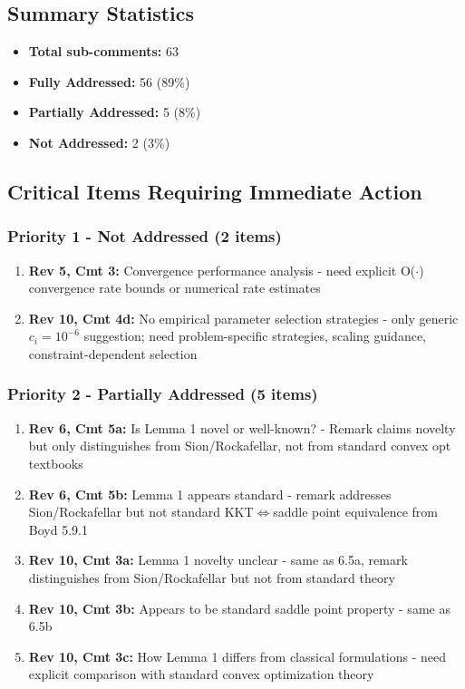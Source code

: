 \documentclass[journal,twoside,web]{ieeecolor}
\begin{document}
\begin{longtable}{|c|c|p{5.5cm}|c|p{3.5cm}|}
\end{longtable}

\subsection*{Summary Statistics}
\begin{itemize}
\item \textbf{Total sub-comments:} 63
\item \textbf{Fully Addressed:} 56 (89\%)
\item \textbf{Partially Addressed:} 5 (8\%)
\item \textbf{Not Addressed:} 2 (3\%)
\end{itemize}

\subsection*{Critical Items Requiring Immediate Action}

\subsubsection*{Priority 1 - Not Addressed (2 items)}
\begin{enumerate}
\item \textbf{Rev 5, Cmt 3:} Convergence performance analysis - need explicit O($\cdot$) convergence rate bounds or numerical rate estimates
\item \textbf{Rev 10, Cmt 4d:} No empirical parameter selection strategies - only generic $c_i=10^{-6}$ suggestion; need problem-specific strategies, scaling guidance, constraint-dependent selection
\end{enumerate}

\subsubsection*{Priority 2 - Partially Addressed (5 items)}
\begin{enumerate}
\item \textbf{Rev 6, Cmt 5a:} Is Lemma 1 novel or well-known? - Remark claims novelty but only distinguishes from Sion/Rockafellar, not from standard convex opt textbooks
\item \textbf{Rev 6, Cmt 5b:} Lemma 1 appears standard - remark addresses Sion/Rockafellar but not standard KKT$\Leftrightarrow$saddle point equivalence from Boyd 5.9.1
\item \textbf{Rev 10, Cmt 3a:} Lemma 1 novelty unclear - same as 6.5a, remark distinguishes from Sion/Rockafellar but not from standard theory
\item \textbf{Rev 10, Cmt 3b:} Appears to be standard saddle point property - same as 6.5b
\item \textbf{Rev 10, Cmt 3c:} How Lemma 1 differs from classical formulations - need explicit comparison with standard convex optimization theory
\end{enumerate}
\end{document}
